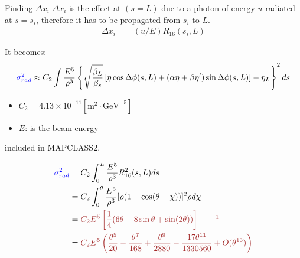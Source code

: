 \documentclass{beamer}
\begin{document}
\begin{frame}{Finding $\Delta x_i$}
$\Delta x_i$ is the effect at $(s=L)$ due to a photon of energy $u$ radiated at $s=s_i$, therefore it has to be propagated from $s_i$ to $L$.%
\begin{align}
 \Delta x_i &= (u/E) R_{16}(s_i,L) 
\end{align}


It becomes:
{\small
\begin{equation*}
 {\color{blue}\sigma_{rad}^2}\approx C_2 \int \frac{E^5}{\rho^3}\left\{\sqrt{\frac{\beta_L}{\beta_s}}\left[\eta\cos\Delta\phi(s,L)+(\alpha\eta+\beta\eta')\sin\Delta\phi(s,L)\right]-\eta_L\right\}^2ds
\end{equation*}
}
\begin{itemize}
 \item $C_2=4.13\times10^{-11}[\text{m}^2\cdot\text{GeV}^{-5}]$
 \item $E$: is the beam energy
\end{itemize}
included in MAPCLASS2.\par

\end{frame}


% 

\newsavebox\radequ
\begin{lrbox}{\radequ}%
  \begin{minipage}{1.0\textwidth}%
  {\scriptsize%
 \raggedleft%
 \vspace*{-3.4cm}
    \begin{align*}
    {\color{blue}\sigma_{rad}^2} &= C_2\int_0^L \frac{E^5}{\rho^3}R_{16}^2(s,L)ds\\
    &= C_2\int_0^\theta \frac{E^5}{\rho^3}[\rho(1-\cos(\theta-\chi))]^2\rho d\chi\\
    &={\color{marron}C_2E^5\left[\frac{1}{4}(6\theta-8\sin\theta+\sin(2\theta))\right]\qquad\footnotemark}\\
    &={\color{marron}C_2E^5\left(\frac{\theta^5}{20}-\frac{\theta^7}{168}+\frac{\theta^9}{2880}-\frac{17\theta^{11}}{1330560}+O(\theta^{13})\right)}
     \end{align*} 
    }
  \end{minipage}
\end{lrbox}
\end{document}
